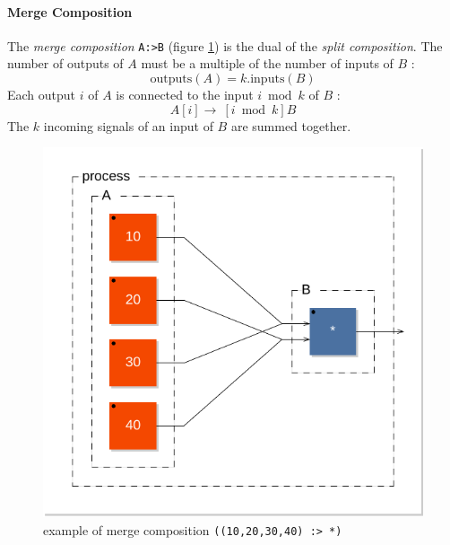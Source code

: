 \paragraph{Merge Composition}
The \emph{merge composition}  \lstinline$A:>B$ (figure \ref{figure-merge1}) is the dual of the \emph{split composition}. The number of outputs of $A$ must be a multiple of the number of inputs of $B$ : 
\begin{equation}
\mathrm{outputs}(A)=k.\mathrm{inputs}(B)                                                                                                                                                                                                                                                  \end{equation}
Each output $i$ of $A$ is connected to the input $i \bmod k$ of $B$ : 
\begin{equation}
A[i]\rightarrow\ [i \bmod k]B                                                                                                   \end{equation} 
The $k$ incoming signals of an input of $B$ are summed together.

\begin{figure}[h]
\centering 
\includegraphics[scale=0.7]{images/merge1} 
\caption{example of merge composition \lstinline'((10,20,30,40) :> *)'}  
\label{figure-merge1}
\end{figure}


